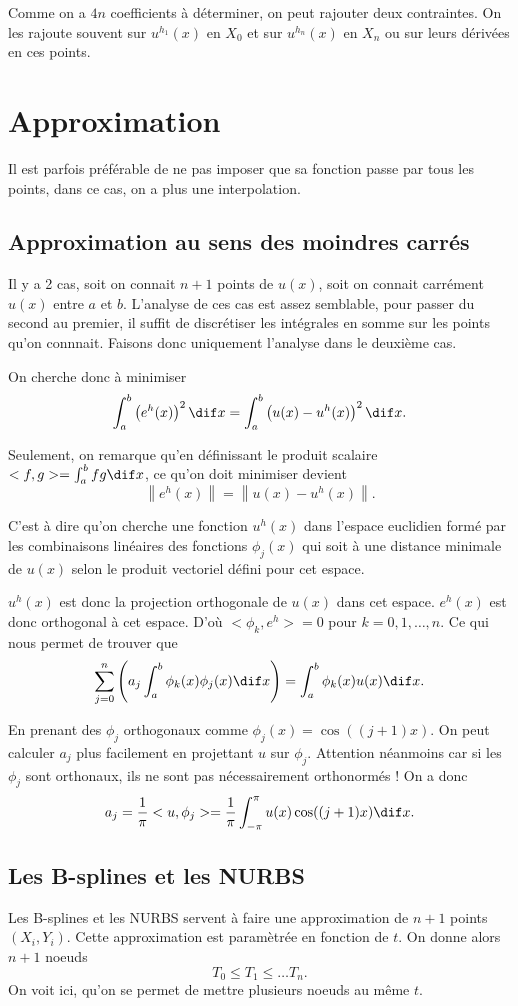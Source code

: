 Comme on a $4n$ coefficients à déterminer, on peut rajouter deux contraintes.
On les rajoute souvent sur $u^{h_1}(x)$ en $X_0$ et sur $u^{h_n}(x)$ en $X_n$
ou sur leurs dérivées en ces points.

\section{Approximation}
Il est parfois préférable de ne pas imposer que sa fonction passe par tous les
points, dans ce cas, on a plus une interpolation.

\subsection{Approximation au sens des moindres carrés}
Il y a 2 cas, soit on connait $n+1$ points de $u(x)$, soit on
connait carrément $u(x)$ entre $a$ et $b$.
L'analyse de ces cas est assez semblable, pour passer du second au premier,
il suffit de discrétiser les intégrales en somme sur les points qu'on connnait.
Faisons donc uniquement l'analyse dans le deuxième cas.

On cherche donc à minimiser
\[ \int_a^b \left(e^h(x)\right)^2 \dif x =
\int_a^b \left(u(x) - u^h(x)\right)^2 \dif x. \]

Seulement, on remarque qu'en définissant le produit scalaire
$<f, g> = \int_a^b fg \dif x$, ce qu'on doit minimiser devient
\[ \left\|e^h(x)\right\| = \left\|u(x) - u^h(x)\right\|. \]

C'est à dire qu'on cherche une fonction $u^h(x)$ dans l'espace euclidien
formé par les combinaisons linéaires des fonctions $\phi_j(x)$ qui soit
à une distance minimale de $u(x)$ selon le produit vectoriel défini pour
cet espace.

$u^h(x)$ est donc la projection orthogonale de $u(x)$ dans cet espace.
$e^h(x)$ est donc orthogonal à cet espace.
D'où $<\phi_k, e^h> = 0$ pour $k = 0, 1, \ldots, n$.
Ce qui nous permet de trouver que
\[ \sum_{j=0}^n \left(a_j \int_a^b \phi_k(x) \phi_j(x) \dif x\right)
= \int_a^b \phi_k(x) u(x) \dif x. \]

En prenant des $\phi_j$ orthogonaux comme $\phi_j(x) = \cos((j+1)x)$.
On peut calculer $a_j$ plus facilement en projettant $u$ sur $\phi_j$.
Attention néanmoins car si les $\phi_j$ sont orthonaux,
ils ne sont pas nécessairement orthonormés !
On a donc
\[ a_j = \frac{1}{\pi} <u, \phi_j> =
\frac{1}{\pi} \int_{-\pi}^{\pi} u(x) \cos((j+1)x) \dif x. \]

\subsection{Les B-splines et les NURBS}
Les B-splines et les NURBS servent à faire une approximation
de $n+1$ points $(X_i, Y_i)$.
Cette approximation est paramètrée en fonction de $t$.
On donne alors $n+1$ noeuds
\[ T_0 \leq T_1 \leq \ldots T_n. \]
On voit ici, qu'on se permet de mettre plusieurs noeuds au même $t$.

